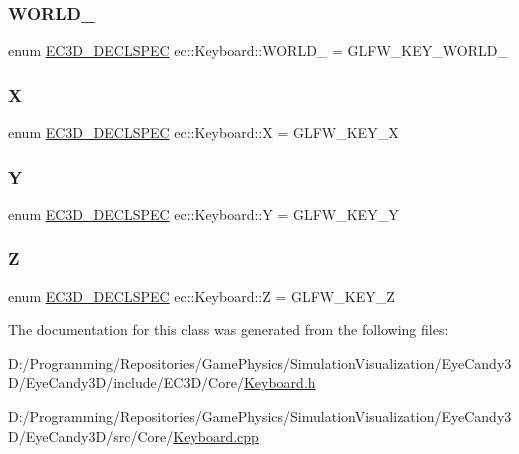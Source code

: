 \subsubsection{\texorpdfstring{W\+O\+R\+L\+D\+\_}{WORLD\_2}}
{\footnotesize\ttfamily enum \mbox{\hyperlink{_common_8h_aac42573e202ca3dd4d259c81691e2369}{E\+C3\+D\+\_\+\+D\+E\+C\+L\+S\+P\+EC}} ec\+::\+Keyboard\+::\+W\+O\+R\+L\+D\+\_ = G\+L\+F\+W\+\_\+\+K\+E\+Y\+\_\+\+W\+O\+R\+L\+D\+\_}

\mbox{\label{classec_1_1_keyboard_a46a9272c629195e29395f7e8d22e7cf5}} 
\subsubsection{\texorpdfstring{X}{X}}
{\footnotesize\ttfamily enum \mbox{\hyperlink{_common_8h_aac42573e202ca3dd4d259c81691e2369}{E\+C3\+D\+\_\+\+D\+E\+C\+L\+S\+P\+EC}} ec\+::\+Keyboard\+::X = G\+L\+F\+W\+\_\+\+K\+E\+Y\+\_\+X}

\mbox{\label{classec_1_1_keyboard_a3e6065997f9693286591e1300769e13a}} 
\subsubsection{\texorpdfstring{Y}{Y}}
{\footnotesize\ttfamily enum \mbox{\hyperlink{_common_8h_aac42573e202ca3dd4d259c81691e2369}{E\+C3\+D\+\_\+\+D\+E\+C\+L\+S\+P\+EC}} ec\+::\+Keyboard\+::Y = G\+L\+F\+W\+\_\+\+K\+E\+Y\+\_\+Y}

\mbox{\label{classec_1_1_keyboard_a342c1ef739e9fd209135017e48f25c58}} 
\subsubsection{\texorpdfstring{Z}{Z}}
{\footnotesize\ttfamily enum \mbox{\hyperlink{_common_8h_aac42573e202ca3dd4d259c81691e2369}{E\+C3\+D\+\_\+\+D\+E\+C\+L\+S\+P\+EC}} ec\+::\+Keyboard\+::Z = G\+L\+F\+W\+\_\+\+K\+E\+Y\+\_\+Z}



The documentation for this class was generated from the following files\+:\begin{DoxyCompactItemize}
\item 
D\+:/\+Programming/\+Repositories/\+Game\+Physics/\+Simulation\+Visualization/\+Eye\+Candy3\+D/\+Eye\+Candy3\+D/include/\+E\+C3\+D/\+Core/\mbox{\hyperlink{_keyboard_8h}{Keyboard.\+h}}\item 
D\+:/\+Programming/\+Repositories/\+Game\+Physics/\+Simulation\+Visualization/\+Eye\+Candy3\+D/\+Eye\+Candy3\+D/src/\+Core/\mbox{\hyperlink{_keyboard_8cpp}{Keyboard.\+cpp}}\end{DoxyCompactItemize}
